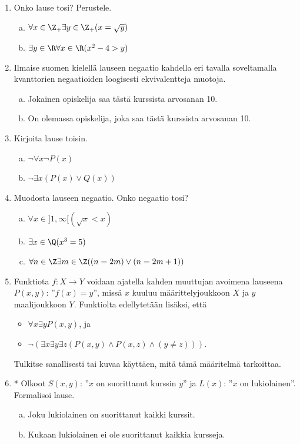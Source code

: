 \begin{enumerate}
\item Onko lause tosi? Perustele.
\begin{enumerate}[a)]
\item $\forall x\in \Z_{+} \exists y\in \Z_{+} (x = \sqrt{y})
$
\item $\exists y\in \R \forall x\in \R (x^2 - 4 > y)$
\end{enumerate}

\item Ilmaise suomen kielellä lauseen negaatio kahdella eri
tavalla soveltamalla kvanttorien negaatioiden loogisesti
ekvivalentteja muotoja.
\begin{enumerate}[a)]
\item Jokainen opiskelija saa tästä kurssista arvosanan 10.
\item On olemassa opiskelija, joka saa tästä kurssista
arvosanan 10.
\end{enumerate}

\item Kirjoita lause toisin.
\begin{enumerate}[a)]
\item $\lnot \forall x \lnot P(x)$
\item $\lnot \exists x (P(x) \lor Q(x))$
\end{enumerate}

\item
Muodosta lauseen negaatio. Onko negaatio tosi?
\begin{enumerate}[a)]
\item $\forall x\in ]1, \infty [ (\sqrt{x} < x)$
\item $\exists x\in \Q (x^3 = 5)$
\item $\forall n \in \Z \exists m \in \Z ((n = 2m) \lor (n =
2m+1))$
\end{enumerate}

\item Funktiota $f\colon X\to Y$ voidaan ajatella kahden
muuttujan avoimena lauseena $P(x, y)$: ''$f(x) = y$'', missä
$x$ kuuluu määrittelyjoukkoon $X$ ja $y$ maalijoukkoon $Y$.
Funktiolta edellytetään lisäksi, että
\begin{itemize}
\item $\forall x \exists y P(x, y)$, ja
\item $\lnot (\exists x \exists y \exists z (P(x, y) \land P(x, z)
\land (y \neq z)))$.
\end{itemize}
Tulkitse sanallisesti tai kuvaa käyttäen, mitä tämä määritelmä
tarkoittaa.

\item * %
 Olkoot $S(x, y)$: ''$x$ on suorittanut
kurssin $y$'' ja $L(x)$: ''$x$ on lukiolainen''. Formalisoi lause.
\begin{enumerate}[a)]
\item Joku lukiolainen on suorittanut kaikki kurssit.
\item Kukaan lukiolainen ei ole suorittanut kaikkia kursseja.
\end{enumerate}


\end{enumerate}
